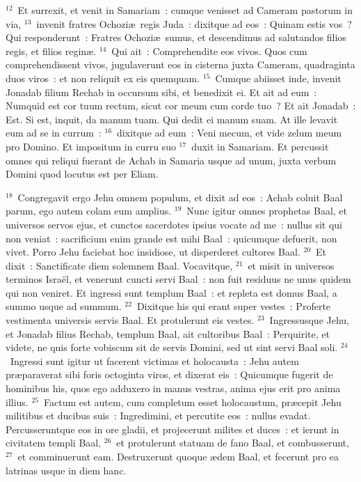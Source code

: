 ${}^{12}$~Et surrexit, et venit in Samariam~: cumque venisset ad Cameram pastorum in via,
${}^{13}$~invenit fratres Ochozi\ae\ regis Juda~: dixitque ad eos~: Quinam estis vos~? Qui responderunt~: Fratres Ochozi\ae\ sumus, et descendimus ad salutandos filios regis, et filios regin\ae .
${}^{14}$~Qui ait~: Comprehendite eos vivos. Quos cum comprehendissent vivos, jugulaverunt eos in cisterna juxta Cameram, quadraginta duos viros~: et non reliquit ex eis quemquam.
${}^{15}$~Cumque abiisset inde, invenit Jonadab filium Rechab in occursum sibi, et benedixit ei. Et ait ad eum~: Numquid est cor tuum rectum, sicut cor meum cum corde tuo~? Et ait Jonadab~: Est. Si est, inquit, da manum tuam. Qui dedit ei manum suam. At ille levavit eum ad se in currum~:
${}^{16}$~dixitque ad eum~: Veni mecum, et vide zelum meum pro Domino. Et impositum in curru suo
${}^{17}$~duxit in Samariam. Et percussit omnes qui reliqui fuerant de Achab in Samaria usque ad unum, juxta verbum Domini quod locutus est per Eliam.


${}^{18}$~Congregavit ergo Jehu omnem populum, et dixit ad eos~: Achab coluit Baal parum, ego autem colam eum amplius.
${}^{19}$~Nunc igitur omnes prophetas Baal, et universos servos ejus, et cunctos sacerdotes ipsius vocate ad me~: nullus sit qui non veniat~: sacrificium enim grande est mihi Baal~: quicumque defuerit, non vivet. Porro Jehu faciebat hoc insidiose, ut disperderet cultores Baal.
${}^{20}$~Et dixit~: Sanctificate diem solemnem Baal. Vocavitque,
${}^{21}$~et misit in universos terminos Isra\"el, et venerunt cuncti servi Baal~: non fuit residuus ne unus quidem qui non veniret. Et ingressi sunt templum Baal~: et repleta est domus Baal, a summo usque ad summum.
${}^{22}$~Dixitque his qui erant super vestes~: Proferte vestimenta universis servis Baal. Et protulerunt eis vestes.
${}^{23}$~Ingressusque Jehu, et Jonadab filius Rechab, templum Baal, ait cultoribus Baal~: Perquirite, et videte, ne quis forte vobiscum sit de servis Domini, sed ut sint servi Baal soli.
${}^{24}$~Ingressi sunt igitur ut facerent victimas et holocausta~: Jehu autem pr\ae paraverat sibi foris octoginta viros, et dixerat eis~: Quicumque fugerit de hominibus his, quos ego adduxero in manus vestras, anima ejus erit pro anima illius.
${}^{25}$~Factum est autem, cum completum esset holocaustum, pr\ae cepit Jehu militibus et ducibus suis~: Ingredimini, et percutite eos~: nullus evadat. Percusseruntque eos in ore gladii, et projecerunt milites et duces~: et ierunt in civitatem templi Baal,
${}^{26}$~et protulerunt statuam de fano Baal, et combusserunt,
${}^{27}$~et comminuerunt eam. Destruxerunt quoque \ae dem Baal, et fecerunt pro ea latrinas usque in diem hanc.


